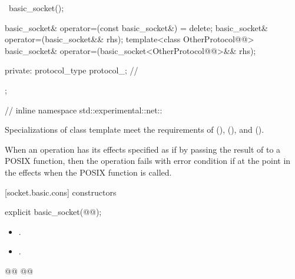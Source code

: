 \begin{codeblock}
{{    ~basic_socket();

    basic_socket& operator=(const basic_socket&) = delete;
    basic_socket& operator=(basic_socket&& rhs);
    template<class OtherProtocol@@>
      basic_socket& operator=(basic_socket<OtherProtocol@@>&& rhs);

  private:
    protocol_type protocol_; // \expos
  };

} // inline namespace std::experimental::net::\namespacever
\end{codeblock}

\pnum
Specializations of class template  meet the requirements of  (),  (), and  ().

\pnum
When an operation has its effects specified as if by passing the result of  to a POSIX function, then the operation fails with error condition  if  at the point in the effects when the POSIX function is called.


[socket.basic.cons]{ constructors}

\begin{itemdecl}
explicit basic_socket(@@);
\end{itemdecl}

\begin{itemdescr}
\pnum
\postconditions
\begin{itemize}
\item
{}.
\item
{}.
\end{itemize}
\end{itemdescr}

\begin{itemdecl}
@@
@@
\end{itemdecl}

\begin{itemdescr}
\addedpnum
{}

\addedpnum
{}
\end{itemdescr}

